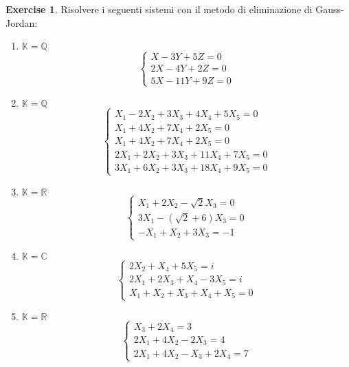 \documentclass{article}
\theoremstyle{plain}
\theoremstyle{definition}
\newtheorem{xca}[exmp]{Exercise}
\theoremstyle{remark}
\begin{document}
\begin{bxthm}
\begin{xca}
    Risolvere i seguenti sistemi con il metodo di eliminazione di Gauss-Jordan:
    \begin{enumerate}
        \item $\mathbb{K}=\mathbb{Q}$
        \[\begin{cases}
            X-3Y+5Z=0 \\
            2X-4Y+2Z=0 \\
            5X-11Y+9Z=0
        \end{cases}\]
        \item $\mathbb{K}=\mathbb{Q}$
        \[\begin{cases}
            X_1 - 2X_2 +3X_3 +4X_4 +5X_5= 0 \\
            X_1 + 4X_2 + 7X_4 + 2X_5= 0 \\
            X_1 + 4X_2 + 7X_4 + 2X_5= 0 \\
            2X_1 + 2X_2 + 3X_3 + 11X_4 + 7X_5= 0 \\
            3X_1 + 6X_2 + 3X_3 + 18X_4 + 9X_5= 0
        \end{cases}\]
        \item $\mathbb{K}=\mathbb{R}$
        \[\begin{cases}
            X_1 + 2X_2-\sqrt{2} X_3 = 0 \\
            3X_1 -(\sqrt{2}+6)X_3 = 0 \\
            -X_1+ X_2 +3X_3 = -1
        \end{cases}\]
        \item $\mathbb{K}=\mathbb{C}$
        \[\begin{cases}
                2X_2+ X_4+5 X_5= i \\
            2X_1 +2 X_3+ X_4-3 X_5= i \\
            X_1+ X_2+ X_3+ X_4+ X_5= 0 
        \end{cases}\]
        \item $\mathbb{K}=\mathbb{R}$
        \[\begin{cases}
            X_3+2 X_4 = 3 \\
            2X_1+4 X_2-2 X_3= 4 \\
            2X_1+4 X_2- X_3+2 X_4= 7
        \end{cases}\]
    \end{enumerate}
\end{xca}
\end{bxthm}
\end{document}
